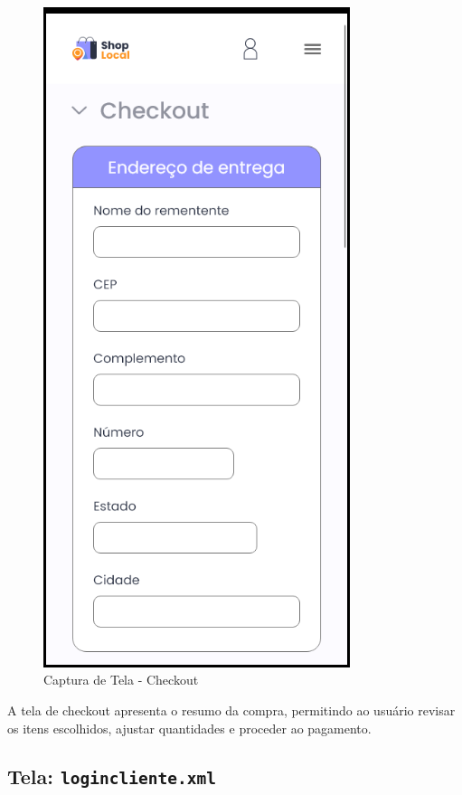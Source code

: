 \documentclass[
	12pt,				%
	openright,			%
	twoside,			%
	a4paper,			%
	english,			%
	brazil				%
	]{abntex2}
\begin{document}
\begin{figure}[htb]
    \centering
    \includegraphics[width=0.8\textwidth]{img/checkout}
    \caption{Captura de Tela - Checkout}
\end{figure}

A tela de checkout apresenta o resumo da compra, permitindo ao usuário revisar os itens escolhidos, ajustar quantidades e proceder ao pagamento.

\subsection{Tela: \texttt{logincliente.xml}}
\end{document}
